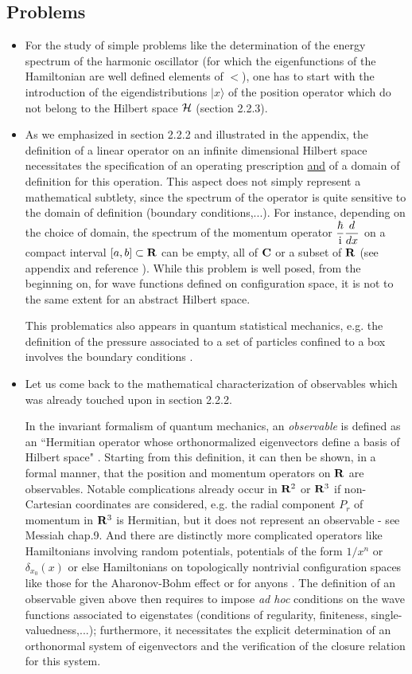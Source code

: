 \documentclass[a4wide,12pt]{report}
\begin{document}
\subsection{Problems}
 
\begin{itemize}
\item
For the study of simple problems like the determination of 
the energy spectrum of the harmonic oscillator 
(for which the eigenfunctions of the Hamiltonian are 
well defined elements of $\lt$),
one has to start with the introduction of the 
eigendistributions $|x \rangle$ of the position operator 
which do not belong to the Hilbert space 
${\cal H}$ (section 2.2.3).
\item
As we emphasized in section 2.2.2 and illustrated in the appendix, 
the definition of a linear operator on an infinite dimensional 
Hilbert space necessitates the specification of an 
operating prescription \underline{and} of a domain of definition 
for this operation. 
This aspect does not simply represent a mathematical subtlety, 
since the spectrum of the operator is quite sensitive to the 
domain of definition (boundary conditions,...). 
For instance, depending on the choice of domain,
the spectrum of the momentum operator 
$\displaystyle{\hbar \over {\rm i}} \displaystyle{d \over dx}$ on a compact interval
$[a,b] \subset {\bf R}$ can be 
empty, all of ${\bf C}$ or a subset of 
 ${\bf R}$ (see appendix  and reference \cite{sg}).
While this problem is well posed,  from the beginning on, for wave
functions defined on configuration space, it is not 
to the same extent for an abstract Hilbert space. 


This problematics also appears in quantum statistical mechanics, 
e.g. the definition of the pressure associated to a 
 set of particles confined to a box involves the 
boundary conditions \cite{rob}.
\item 
Let us come back to the mathematical characterization 
of observables which was already touched upon in section 2.2.2. 

In the invariant formalism of quantum mechanics, an 
{\em observable} is defined as an ``Hermitian operator 
whose orthonormalized eigenvectors define a basis of Hilbert 
space" \cite{ct}. 
Starting from this definition, it can then be shown, in a formal 
manner, that the position and momentum operators on ${\bf R}$ are 
observables. 
Notable complications already occur in ${\bf R}^2$ or ${\bf R}^3$
if non-Cartesian coordinates 
are considered, 
e.g. the radial component 
$P_r$ of momentum in ${\bf R}^3$ is Hermitian, but it does not represent 
an observable - see Messiah \cite{ct} chap.9. 
And there are distinctly more complicated operators 
like Hamiltonians involving random potentials, potentials
of the form $1/  x^n$ or $\delta_{x_0} (x)$
or else Hamiltonians on topologically nontrivial configuration 
spaces like those for the Aharonov-Bohm effect or for anyons
\cite{rs, bs, ber}.
The definition of an observable given above then requires 
to impose {\em ad hoc} conditions on the wave functions 
associated to eigenstates (conditions of regularity, finiteness,
single-valuedness,...); furthermore, it necessitates the
explicit determination  of an orthonormal system of eigenvectors and the
verification  of the closure relation for this system. 


\end{itemize}
\end{document}
